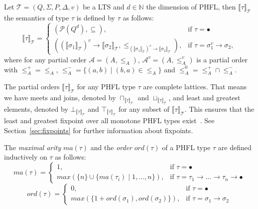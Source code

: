 \begin{definition}
    Let $\mathcal{T} = (Q, \Sigma, P, \Delta, v)$ be a LTS and $d \in \mathbb{N}$ the dimension of PHFL,
    then $\llbracket\tau\rrbracket_\mathcal{T}$ the
    semantics
    of type $\tau$ is defined by $\tau$ as follows:
        \[\llbracket\tau\rrbracket_\mathcal{T}=
        \begin{cases}
            (\mathcal{P}(Q^d), \subseteq),  & \text{if }\tau = \bullet\\
            ((\llbracket\sigma_1\rrbracket_\mathcal{T})^v \rightarrow \llbracket\sigma_2\rrbracket_\mathcal{T}, \leq_{
            (\llbracket\sigma_1\rrbracket_\mathcal{T})^v \rightarrow \llbracket\sigma_2\rrbracket_\mathcal{T}}), &
            \text{if }\tau = \sigma_1^v\rightarrow \sigma_2,
        \end{cases}\]
    where for any partial order $\mathcal{A} = (A, \leq_A)$, $\mathcal{A}^v = (A, \leq_A^v)$ is a partial order
    with $\leq_A^+ = \leq_A$, $\leq_A^- = \{(a, b) \mid (b, a) \in \leq_A\}$ and $\leq_A^0 = \leq_A^+ \cap \leq_A^-$.
\end{definition}

The partial orders $\llbracket\tau\rrbracket_\mathcal{T}$ for any PHFL type $\tau$ are complete lattices. That means we
have meets and joins, denoted by $\sqcap_{\llbracket\tau\rrbracket_\mathcal{T}}$ and
$\sqcup_{\llbracket\tau\rrbracket_\mathcal{T}}$, and least and greatest elements, denoted by
$\bot_{\llbracket\tau\rrbracket_\mathcal{T}}$ and $\top_{\llbracket\tau\rrbracket_\mathcal{T}}$ for any subset of
$\llbracket\tau\rrbracket_\mathcal{T}$. This ensures that the least and greatest fixpoint over all monotone PHFL types
exist~\cite{tarski1955lattice}. See Section~\ref{sec:fixpoints} for further information about fixpoints.

\begin{definition}
    The \emph{maximal arity} $ma(\tau)$ and the \emph{order} $ord(\tau)$ of a PHFL type $\tau$ are defined
    inductively on
    $\tau$ as follows:
\[ma(\tau)=
\begin{cases}
    1, & \text{if }\tau = \bullet\\
    max(\{n\} \cup \{ma(\tau_i)\mid1,\dots,n\}), &
    \text{if }\tau = \tau_1\rightarrow\dots\rightarrow\tau_n\rightarrow\bullet
\end{cases}\]
\[ord(\tau)=
\begin{cases}
    0, & \text{if }\tau = \bullet\\
    max(\{1 + ord(\sigma_1), ord(\sigma_2)\}), & \text{if }\tau = \sigma_1 \rightarrow \sigma_2
\end{cases}\]
\end{definition}

